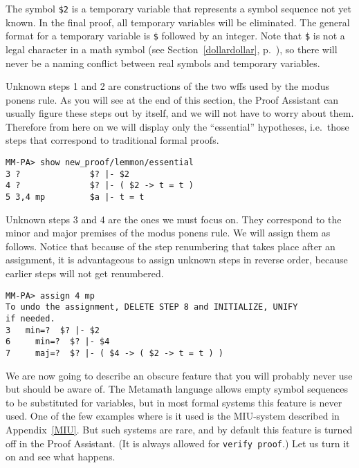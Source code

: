 The symbol \texttt{\$2} is a temporary variable that represents a symbol sequence not yet known.  In the final
proof, all temporary variables will be eliminated.  The general format
for a temporary variable is \texttt{\$} followed by an integer.  Note
that \texttt{\$} is not a legal character in a math symbol (see
Section~\ref{dollardollar}, p.~\pageref{dollardollar}), so there will
never be a naming conflict between real symbols and temporary variables.

Unknown steps 1 and 2 are constructions of the two wffs used by the
modus ponens rule.  As you will see at the end of this section, the
Proof Assistant can usually figure these steps
out by itself, and we will not have to worry about them.  Therefore from
here on we will display only the ``essential'' hypotheses, i.e.\ those
steps that correspond to traditional formal proofs.

\begin{verbatim}
MM-PA> show new_proof/lemmon/essential
3 ?              $? |- $2
4 ?              $? |- ( $2 -> t = t )
5 3,4 mp         $a |- t = t
\end{verbatim}

Unknown steps 3 and 4 are the ones we must focus on.  They correspond to the
minor and major premises of the modus ponens rule.  We will assign them as
follows.  Notice that because of the step renumbering that takes place
after an assignment, it is advantageous to assign unknown steps in reverse
order, because earlier steps will not get renumbered.

\begin{verbatim}
MM-PA> assign 4 mp
To undo the assignment, DELETE STEP 8 and INITIALIZE, UNIFY
if needed.
3   min=?  $? |- $2
6     min=?  $? |- $4
7     maj=?  $? |- ( $4 -> ( $2 -> t = t ) )
\end{verbatim}

We are now going to describe an obscure feature that you will probably
never use but should be aware of.  The Metamath language allows empty
symbol sequences to be substituted for variables, but in most formal
systems this feature is never used.  One of the few examples where is it
used is the MIU-system described in
Appendix~\ref{MIU}.  But such systems are rare, and by default this
feature is turned off in the Proof Assistant.  (It is always allowed for
{\tt verify proof}.)  Let us turn it on and see what
happens.

